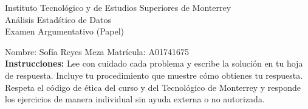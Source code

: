 \documentclass[10pt]{report}
\begin{document}
\newpage



\begin{center}
{\large Instituto Tecnol\'{o}gico y de Estudios Superiores de Monterrey \\
An\'alisis Estad\'stico de Datos } \\
Examen Argumentativo (Papel)
\end{center}

Nombre: \underline{\hspace*{.2in}}
Sof\'ia Reyes Meza
\underline{\hspace*{.2in}} \quad Matr\'icula:\underline{\hspace*{.2in}}
A01741675
\underline{\hspace*{.2in}} \\

{\bf Instrucciones:} Lee con cuidado cada problema y escribe la soluci\'on
en tu hoja de respuesta. Incluye tu procedimiento que muestre c\'omo obtienes tu respuesta.  Respeta el c\'odigo de \'etica del curso y del Tecnol\'ogico de Monterrey y responde los ejercicios de manera individual sin ayuda externa o no autorizada.
\end{document}

